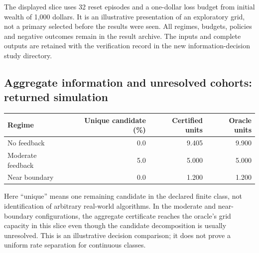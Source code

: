 The displayed slice uses 32 reset episodes and a one-dollar loss budget from
initial wealth of 1,000 dollars. It is an illustrative presentation of an
exploratory grid, not a primary selected before the results were seen. All
regimes, budgets, policies and negative outcomes remain in the result archive.
The inputs and complete outputs are retained with the verification record in
the new information-decision study directory.

\subsection*{Aggregate information and unresolved cohorts: returned simulation}
\begin{center}\small
\begin{tabular}{lrrr}
\toprule
Regime & Unique candidate (\%) & Certified units & Oracle units\\
\midrule
No feedback & 0.0 & 9.405 & 9.900\\
Moderate feedback & 5.0 & 5.000 & 5.000\\
Near boundary & 0.0 & 1.200 & 1.200\\
\bottomrule
\end{tabular}
\end{center}
Here ``unique'' means one remaining candidate in the declared finite class,
not identification of arbitrary real-world algorithms. In the moderate and
near-boundary configurations, the aggregate certificate reaches the oracle's
grid capacity in this slice even though the candidate decomposition is usually
unresolved. This is an illustrative decision comparison; it does not prove a
uniform rate separation for continuous classes.

